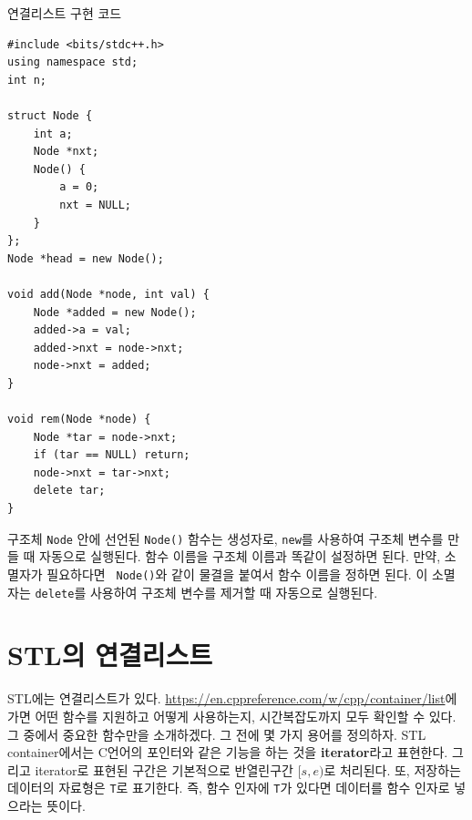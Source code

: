 \begin{code} \label{code: linked-list}
연결리스트 구현 코드
\begin{lstlisting}
#include <bits/stdc++.h>
using namespace std;
int n;
    
struct Node {
    int a;
    Node *nxt;
    Node() {
        a = 0;
        nxt = NULL;
    }
};
Node *head = new Node();
    
void add(Node *node, int val) {
    Node *added = new Node();
    added->a = val;
    added->nxt = node->nxt;
    node->nxt = added;
}
    
void rem(Node *node) {
    Node *tar = node->nxt;
    if (tar == NULL) return;
    node->nxt = tar->nxt;
    delete tar;
}
\end{lstlisting}
\end{code}

구조체 \texttt{Node} 안에 선언된 \texttt{Node()} 함수는 생성자로, \texttt{new}를 사용하여 구조체 변수를 만들 때 자동으로 실행된다. 함수 이름을 구조체 이름과 똑같이 설정하면 된다. 만약, 소멸자가 필요하다면 \texttt{~Node()}와 같이 물결을 붙여서 함수 이름을 정하면 된다. 이 소멸자는 \texttt{delete}를 사용하여 구조체 변수를 제거할 때 자동으로 실행된다.

\section{STL의 연결리스트}
STL에는 연결리스트가 있다. \url{https://en.cppreference.com/w/cpp/container/list}에 가면 어떤 함수를 지원하고 어떻게 사용하는지, 시간복잡도까지 모두 확인할 수 있다. 그 중에서 중요한 함수만을 소개하겠다. 그 전에 몇 가지 용어를 정의하자. STL container에서는 C언어의 포인터와 같은 기능을 하는 것을 \textbf{iterator}라고 표현한다. 그리고 iterator로 표현된 구간은 기본적으로 반열린구간 $[s, e)$로 처리된다. 또, 저장하는 데이터의 자료형은 \texttt{T}로 표기한다. 즉, 함수 인자에 \texttt{T}가 있다면 데이터를 함수 인자로 넣으라는 뜻이다.

